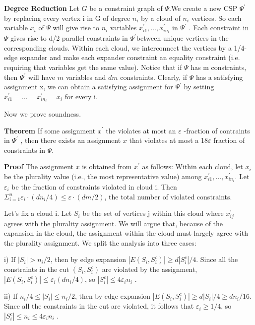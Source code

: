 \documentclass[11pt]{article}
\begin{document}
\textbf{Degree Reduction}
Let $G$ be a constraint graph of $\Psi$.We create a new CSP $\Psi^{'}$ by replacing every vertex i in G of
degree $n_i$ by a cloud of $n_i$ vertices. So each variable $x_i$ of $\Psi$ will give rise to $n_i$ variables $x^{'}_{i1} , \ldots , x^{'}_{in_{i}}$ in $\Psi^{'}$ . Each constraint in $\Psi$ gives rise to d/2 parallel constraints in $\Psi^{'}$between unique vertices in
the corresponding clouds. Within each cloud, we interconnect the vertices by a 1/4-edge expander
and make each expander constraint an equality constraint (i.e. requiring that variables get the
same value). Notice that if $\Psi$ has m constraints, then $\Psi^{'}$ will have $m$ variables and $dm$ constraints.
\newline Clearly, if $\Psi$  has a satisfying assignment x, we can obtain a satisfying assignment for $\Psi^{'}$ by setting
$x^{'}_{i1} = \ldots = x^{'}_{in_{i}}= x_i$ for every i.

Now we prove soundness.

\textbf {Theorem}
If some assignment $x^{'}$ the violates at most an $\varepsilon$ -fraction of contraints in $\Psi^{'}$  , then there
exists an assignment $x$ that violates at most a 18$\varepsilon $ fraction of constraints in $\Psi$.

\textbf {Proof}
The assignment $x$ is obtained from $x^{'}$ as follows: Within each cloud, let $x_i$ be the plurality value (i.e.,
the most representative value) among $x^{'}_{i1} , \ldots , x^{'}_{in_{i}}$. Let $\varepsilon_{i}$ be the fraction of constraints violated in cloud i. Then $\Sigma_{i=1}^{n} \varepsilon_i · (dn_{i} /4) ≤ \varepsilon ·(dm/2)$, the total number of violated constraints.

Let’s fix a cloud i. Let $S_i$ be the set of vertices j within this cloud where $x_{ij}^{'}$ agrees with the
plurality assignment. We will argue that, because of the expansion in the cloud, the assignment
within the cloud must largely agree with the plurality assignment. We split the analysis into three
cases:

 i) If $|S_i| > n_i/2$, then by edge expansion $|E(S_i , S_{i}^{c} )| \geq  d|S_{i}^{c}|/4$. Since all the constraints in the cut $(S_i , S_{i}^{c} )$ are violated by the assignment, $|E(S_i , S_{i}^{c} )| \leq  \varepsilon_{i}(dn_i/4)$, so $|S_{i}^{c}| \leq  4ε_i n_i$ .

 ii) If $n_i/4 \leq  |S_i|\leq   n_i/2$, then by edge expansion $|E(S_i , S_{i}^{c} )| \geq  d|S_i|/4 \geq dn_i/16$. Since all the
constraints in the cut are violated, it follows that $\varepsilon_{i} \geq 1/4$, so $|S_{i}^{c}| \leq  n_i \leq 4\varepsilon_i n_i$ .
\end{document}
